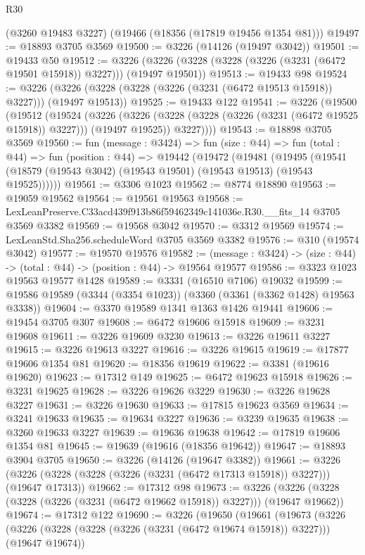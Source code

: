 \begin{lexlean}{R30}
\begin{coremodule}
    (@3260 @19483 @3227)
    (@19466 (@18356 (@17819 @19456 @1354 @81)))
@19497 := @18893 @3705 @3569
@19500 := @3226 (@14126 (@19497 @3042))
@19501 := @19433 @50
@19512 := @3226 (@3226 (@3228 (@3228 (@3226 (@3231 (@6472 @19501 @15918)) @3227))) (@19497 @19501))
@19513 := @19433 @98
@19524 := @3226 (@3226 (@3228 (@3228 (@3226 (@3231 (@6472 @19513 @15918)) @3227))) (@19497 @19513))
@19525 := @19433 @122
@19541 := @3226
    (@19500
      (@19512
        (@19524
          (@3226
            (@3226 (@3228 (@3228 (@3226 (@3231 (@6472 @19525 @15918)) @3227))) (@19497 @19525))
            @3227))))
@19543 := @18898 @3705 @3569
@19560 := fun (message : @3424) =>
  fun (size : @44) =>
  fun (total : @44) =>
  fun (position : @44) =>
  @19442
    (@19472
      (@19481
        (@19495 (@19541 (@18579 (@19543 @3042) (@19543 @19501) (@19543 @19513) (@19543 @19525))))))
@19561 := @3306 @1023
@19562 := @8774 @18890
@19563 := @19059 @19562
@19564 := @19561 @19563
@19568 := LexLeanPreserve.C33acd439f913b86f59462349c141036e.R30.__fits_14 @3705 @3569 @3382
@19569 := @19568 @3042
@19570 := @3312 @19569
@19574 := LexLeanStd.Sha256.scheduleWord @3705 @3569 @3382
@19576 := @310 (@19574 @3042)
@19577 := @19570 @19576
@19582 := (message : @3424) -> (size : @44) -> (total : @44) -> (position : @44) -> @19564 @19577
@19586 := @3323 @1023 @19563 @19577 @1428
@19589 := @3331 (@16510 @7106) @19032
@19599 := @19586 @19589 (@3344 (@3354 @1023)) (@3360 (@3361 (@3362 @1428) @19563 @3338))
@19604 := @3370 @19589 @1341 @1363 @1426 @19441
@19606 := @19454 @3705 @307
@19608 := @6472 @19606 @15918
@19609 := @3231 @19608
@19611 := @3226 @19609 @3230
@19613 := @3226 @19611 @3227
@19615 := @3226 @19613 @3227
@19616 := @3226 @19615
@19619 := @17877 @19606 @1354 @81
@19620 := @18356 @19619
@19622 := @3381 (@19616 @19620)
@19623 := @17312 @149
@19625 := @6472 @19623 @15918
@19626 := @3231 @19625
@19628 := @3226 @19626 @3229
@19630 := @3226 @19628 @3227
@19631 := @3226 @19630
@19633 := @17815 @19623 @3569
@19634 := @3241 @19633
@19635 := @19634 @3227
@19636 := @3239 @19635
@19638 := @3260 @19633 @3227
@19639 := @19636 @19638
@19642 := @17819 @19606 @1354 @81
@19645 := @19639 (@19616 (@18356 @19642))
@19647 := @18893 @3904 @3705
@19650 := @3226 (@14126 (@19647 @3382))
@19661 := @3226 (@3226 (@3228 (@3228 (@3226 (@3231 (@6472 @17313 @15918)) @3227))) (@19647 @17313))
@19662 := @17312 @98
@19673 := @3226 (@3226 (@3228 (@3228 (@3226 (@3231 (@6472 @19662 @15918)) @3227))) (@19647 @19662))
@19674 := @17312 @122
@19690 := @3226
    (@19650
      (@19661
        (@19673
          (@3226
            (@3226 (@3228 (@3228 (@3226 (@3231 (@6472 @19674 @15918)) @3227))) (@19647 @19674))

\end{coremodule}
\end{lexlean}

